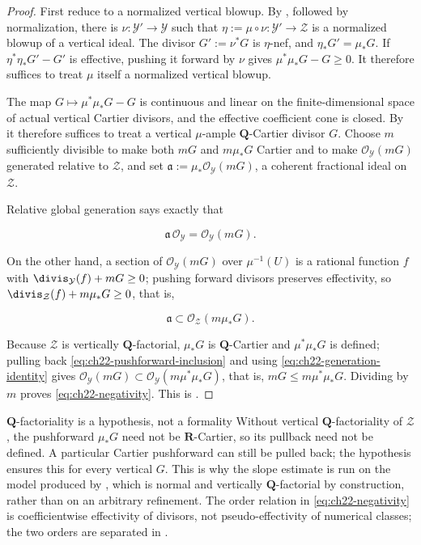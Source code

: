 \begin{proof}
First reduce to a normalized vertical blowup.  By
, followed by normalization, there is
$\nu:\mathcal Y'\to\mathcal Y$ such that
$\eta:=\mu\circ\nu:\mathcal Y'\to\mathcal Z$ is a normalized blowup of
a vertical ideal.  The divisor $G':=\nu^*G$ is $\eta$-nef, and
$\eta_*G'=\mu_*G$.  If $\eta^*\eta_*G'-G'$ is effective, pushing it
forward by $\nu$ gives $\mu^*\mu_*G-G\geq0$.  It therefore suffices to
treat $\mu$ itself a normalized vertical blowup.

The map $G\mapsto\mu^*\mu_*G-G$ is continuous and linear on the
finite-dimensional space of actual vertical Cartier divisors, and the
effective coefficient cone is closed.  By
 it therefore suffices to treat a
vertical $\mu$-ample $\mathbf Q$-Cartier divisor $G$.  Choose $m$
sufficiently divisible to make both $mG$ and $m\mu_*G$ Cartier and to
make $\mathcal O_{\mathcal Y}(mG)$ generated relative to
$\mathcal Z$, and set
$\mathfrak a:=\mu_*\mathcal O_{\mathcal Y}(mG)$, a coherent fractional
ideal on $\mathcal Z$.

Relative global generation says exactly that

\[
       \mathfrak a\,\mathcal O_{\mathcal Y}
       =\mathcal O_{\mathcal Y}(mG).
\tag{22.32}\label{eq:ch22-generation-identity}
\]

On the other hand, a section of $\mathcal O_{\mathcal Y}(mG)$ over
$\mu^{-1}(U)$ is a rational function $f$ with
$\divis_{\mathcal Y}(f)+mG\geq0$; pushing forward divisors preserves
effectivity, so $\divis_{\mathcal Z}(f)+m\mu_*G\geq0$, that is,

\[
 \mathfrak a\subset\mathcal O_{\mathcal Z}(m\mu_*G).
\tag{22.33}\label{eq:ch22-pushforward-inclusion}
\]

Because $\mathcal Z$ is vertically $\mathbf Q$-factorial, $\mu_*G$ is
$\mathbf Q$-Cartier and $\mu^*\mu_*G$ is defined; pulling back
\eqref{eq:ch22-pushforward-inclusion} and using
\eqref{eq:ch22-generation-identity} gives
$\mathcal O_{\mathcal Y}(mG)\subset\mathcal O_{\mathcal Y}(m\mu^*\mu_*G)$,
that is, $mG\leq m\mu^*\mu_*G$.  Dividing by $m$ proves
\eqref{eq:ch22-negativity}.  This is \cite[Lemma~1.6]{BFJ16}.
\end{proof}

\begin{warning}{$\mathbf Q$-factoriality is a hypothesis, not a formality}
Without vertical $\mathbf Q$-factoriality of $\mathcal Z$, the
pushforward $\mu_*G$ need not be $\mathbf R$-Cartier, so its pullback
need not be defined.  A particular Cartier pushforward can still be pulled
back; the hypothesis ensures this for every vertical $G$.
This is why the slope
estimate is run on the model produced by
, which is normal and vertically
$\mathbf Q$-factorial by construction, rather than on an arbitrary
refinement.  The order relation in \eqref{eq:ch22-negativity} is
coefficientwise effectivity of divisors, not pseudo-effectivity of numerical
classes; the two orders are separated in
.
\end{warning}

